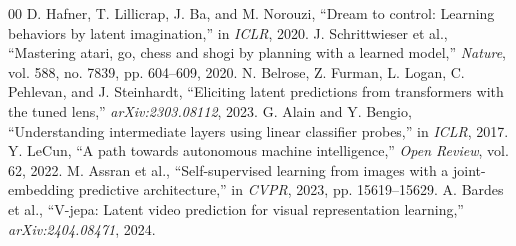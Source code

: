 \documentclass[conference]{IEEEtran}
\begin{document}
\begin{thebibliography}{00}
 D. Hafner, T. Lillicrap, J. Ba, and M. Norouzi, ``Dream to control: Learning behaviors by latent imagination,'' in \textit{ICLR}, 2020.
 J. Schrittwieser et al., ``Mastering atari, go, chess and shogi by planning with a learned model,'' \textit{Nature}, vol. 588, no. 7839, pp. 604--609, 2020.
 N. Belrose, Z. Furman, L. Logan, C. Pehlevan, and J. Steinhardt, ``Eliciting latent predictions from transformers with the tuned lens,'' \textit{arXiv:2303.08112}, 2023.
 G. Alain and Y. Bengio, ``Understanding intermediate layers using linear classifier probes,'' in \textit{ICLR}, 2017.
 Y. LeCun, ``A path towards autonomous machine intelligence,'' \textit{Open Review}, vol. 62, 2022.
 M. Assran et al., ``Self-supervised learning from images with a joint-embedding predictive architecture,'' in \textit{CVPR}, 2023, pp. 15619--15629.
 A. Bardes et al., ``V-jepa: Latent video prediction for visual representation learning,'' \textit{arXiv:2404.08471}, 2024.
\end{thebibliography}
\end{document}
